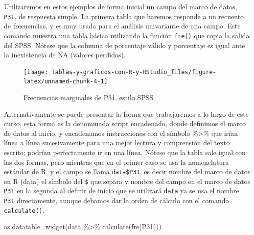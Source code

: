 \documentclass[
]{book}
\newenvironment{Shaded}{\begin{snugshade}}{\end{snugshade}}
\newcommand{\FunctionTok}[1]{\textcolor[rgb]{0.00,0.00,0.00}{#1}}
\newcommand{\NormalTok}[1]{#1}
\newcommand{\OtherTok}[1]{\textcolor[rgb]{0.56,0.35,0.01}{#1}}
\newcommand{\SpecialCharTok}[1]{\textcolor[rgb]{0.00,0.00,0.00}{#1}}
\begin{document}
Utilizaremos en estos ejemplos de forma inicial un campo del marco de datos, \texttt{P31}, de respuesta simple. La primera tabla que haremos responde a un recuento de frecuencias, y es muy usada para el análisis univariante de una campo. Este comando muestra una tabla básica utilizando la función \texttt{fre()} que copia la salida del SPSS. Nótese que la columna de porcentaje válido y porcentaje es igual ante la inexistencia de NA (valores perdidos).

\begin{Shaded}
\end{Shaded}

\begin{figure}[H]

{\centering \texttt{[image: Tablas-y-graficos-con-R-y-RStudio\_files/figure-latex/unnamed-chunk-4-1]} 

}

\caption{Frecuencias marginales de P31, estilo SPSS}\label{fig:unnamed-chunk-4}
\end{figure}

Alternativamente se puede presentar la forma que trabajaremos a lo largo de este curso, esta forma es la denominada script encadenado, donde definimos el marco de datos al inicio, y encadenamos instrucciones con el símbolo \%\textgreater\% que irían línea a línea sucesivamente para una mejor lectura y comprensión del texto escrito; podrían perfectamente ir en una línea. Nótese que la tabla sale igual con las dos formas, pero mientras que en el primer caso se usa la nomenclatura estándar de R, y el campo se llama \texttt{data\$P31}, es decir nombre del marco de datos en R (data) el símbolo del \texttt{\$} que separa y nombre del campo en el marco de datos \texttt{P31} en la segunda al definir de inicio que se utilizará \texttt{data} ya se usa el nombre \texttt{P31} directamente, aunque debamos dar la orden de cálculo con el comando \texttt{calculate()}.

\begin{Shaded}
\begin{Highlighting}[]
\FunctionTok{as.datatable\_widget}\NormalTok{(data }\SpecialCharTok{\%\textgreater{}\%}
  \FunctionTok{calculate}\NormalTok{(}\FunctionTok{fre}\NormalTok{(P31)))}
\end{Highlighting}
\end{Shaded}
\end{document}
